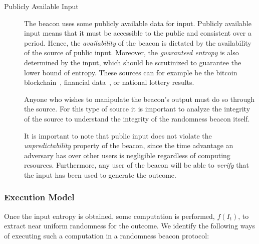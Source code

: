 \begin{description}
    \item[Publicly Available Input]
        The beacon uses some publicly available data for input.
        Publicly available input means that it must be accessible to the public and consistent over a period.
        Hence, the \emph{availability} of the beacon is dictated by the availability of the source of public input.
        Moreover, the \emph{guaranteed entropy} is also determined by the input, which should be scrutinized to guarantee the lower bound of entropy.
        These sources can for example be the bitcoin blockchain~\cite{bonneau2015bitcoin, bentov2016bitcoin}, financial data~\cite{clark2010use}, or national lottery results.

        Anyone who wishes to manipulate the beacon's output must do so through the source.
        For this type of source it is important to analyze the integrity of the source to understand the integrity of the randomness beacon itself.

        It is important to note that public input does not violate the \emph{unpredictability} property of the beacon, since the time advantage an adversary has over other users is negligible regardless of computing resources.
        Furthermore, any user of the beacon will be able to \emph{verify} that the input has been used to generate the outcome.

\end{description}

\subsubsection{Execution Model}
Once the input entropy is obtained, some computation is performed, $f(I_t)$, to extract near uniform randomness for the outcome.
We identify the following ways of executing such a computation in a randomness beacon protocol:

